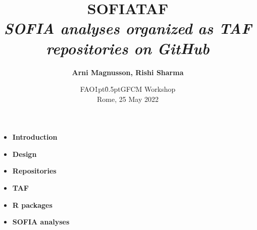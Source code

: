 \documentclass[aspectratio=169]{beamer}
\begin{document}
\begin{frame}
  \title{\vspace{-4ex}
    \darkgray SOFIA\raisebox{1pt}{\h{1.5pt}-\h{-1pt}}TAF\\[2ex]
    \normalsize\blue\mdseries\it
    SOFIA analyses organized as TAF repositories on GitHub}
  \author{\vspace{-10ex}\darkgray\bf
    Arni Magnusson, Rishi Sharma}
  \date{\vspace{-1ex}\darkgray FAO\h{1pt}\raisebox{1pt}{-}\h{0.5pt}GFCM Workshop\\[0.3ex]
    Rome, 25 May 2022}
  \titlepage
\end{frame}


\begin{frame}{\SOFIATAF}
  \begin{itemize}
    \item[]{\darkgray\bf Introduction}
    \\[3.5ex]
    \item[]{\darkgray\bf Design}
    \\[3.5ex]
    \item[]{\darkgray\bf Repositories}
    \\[3.5ex]
    \item[]{\darkgray\bf TAF}
    \\[3.5ex]
    \item[]{\darkgray\bf R packages}
    \\[3.5ex]
    \item[]{\darkgray\bf SOFIA analyses}
    \\[3.5ex]
  \end{itemize}
\end{frame}

\end{document}

